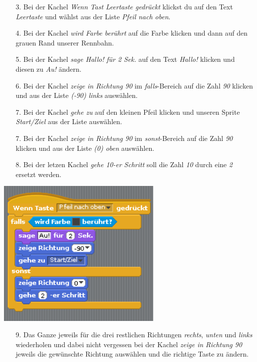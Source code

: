 \begin{itemize}
\item[3. ] Bei der Kachel \textit{Wenn Tast Leertaste gedrückt} klickst du auf den Text \textit{Leertaste} und wählst aus der Liste \textit{Pfeil nach oben}.
\item[4. ] Bei der Kachel \textit{wird Farbe berührt} auf die Farbe klicken und dann auf den grauen Rand unserer Rennbahn.
\item[5. ] Bei der Kachel \textit{sage Hallo! für 2 Sek.} auf den Text \textit{Hallo!} klicken und diesen zu \textit{Au!} ändern.
\item[6. ] Bei der Kachel \textit{zeige in Richtung 90} im \textit{falls}-Bereich auf die Zahl \textit{90} klicken und aus der Liste \textit{(-90) links} auswählen.
\item[7. ] Bei der Kachel \textit{gehe zu} auf den kleinen Pfeil klicken und unseren Sprite \textit{Start/Ziel} aus der Liste auswählen.
\item[7. ] Bei der Kachel \textit{zeige in Richtung 90} im \textit{sonst}-Bereich auf die Zahl \textit{90} klicken und aus der Liste \textit{(0) oben} auswählen.
\item[8. ] Bei der letzen Kachel \textit{gehe 10-er Schritt} soll die Zahl \textit{10} durch eine \textit{2} ersetzt werden.
\end{itemize}
\includegraphics[width=0.6\textwidth]{images/aufgabe4_bewege_katze_nach_oben.png}

\begin{itemize}
\item[9. ] Das Ganze jeweils für die drei restlichen Richtungen \textit{rechts}, \textit{unten} und \textit{links} wiederholen und dabei nicht vergessen bei der Kachel \textit{zeige in Richtung 90} jeweils die gewünschte Richtung auswählen und die richtige Taste zu ändern.
\end{itemize}

